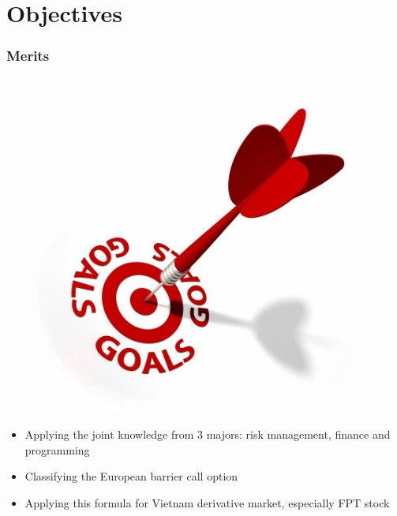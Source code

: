 \documentclass{beamer}
\begin{document}
\section{Objectives} 
\begin{frame}
\frametitle{Merits}
\begin{figure}[htp]
	\begin{center}
		\includegraphics[scale=0.2]{fig3}
	\end{center}
	\label{reffig3}
\end{figure} \pause
	\begin{itemize}
		\item Applying the joint knowledge from 3 majors: risk management, finance and programming \pause
		\item Classifying the European barrier call option \pause
		\item Applying this formula for Vietnam derivative market, especially FPT stock
	\end{itemize}		
\end{frame}
\end{document}
